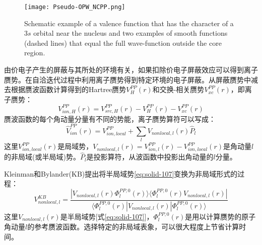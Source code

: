 \begin{figure}[h!]
\centering
\vspace*{-0.10in}
\texttt{[image: Pseudo-OPW\_NCPP.png]}
\caption{\small \textrm{Schematic example of a valence function that has the character of a $3s$ orbital near the nucleus and two examples of smooth functions (dashed lines) that equal the full wave-function outside the core region.}}%
\label{Pseudo-OPW_NCPP}
\end{figure}
由价电子产生的屏蔽与其所处的环境有关，如果扣除价电子屏蔽效应可以得到离子赝势。在自洽迭代过程中利用离子赝势得到特定环境的电子屏蔽。从屏蔽赝势中减去根据赝波函数计算得到的Hartree赝势$V_H^{PP}(r)$和交换-相关赝势$V_{xc}^{PP}(r)$，即离子赝势\cite{PRB43-1993_1991}：
$$V_{ion,H}^{PP}(r)=V_{src,H}^{PP}(r)-V_H^{PP}(r)-V_{xc}^{PP}(r)$$
赝波函数的每个角动量分量有不同的势能，离子赝势算符可以写成：
\begin{equation}
  \hat V_{ion}^{PP}(r)=V_{ion,local}^{PP}+\sum_lV_{nonlocal,l}(r)\hat P_l
  \label{eq:solid-107}
\end{equation}
这里$V_{ion,local}^{PP}(r)$是局域势，$V_{nonlocal,l}(r)=V_{ion,l}^{PP}(r)-V_{ion,local}^{PP}(r)$是角动量$l$的非局域(或半局域)势。$\hat P_l$是投影算符，从波函数中投影出角动量的$l$分量。

Kleinman和Bylander(KB)\cite{PRL48-1425_1982}提出将半局域势\eqref{eq:solid-107}变换为非局域形式的过程：
$$V_{nonlocal,l}^{KB}=\dfrac{|V_{nonlocal,l}(r)\Phi_l^{PP,0}(r)\rangle\langle\Phi_l^{PP,0}(r)V_{nonlocal,l}(r)|}{\langle\Phi_l^{PP,0}(r)|V_{nonlocal,l}(r)|\Phi_l^{PP,0}(r)\rangle}$$
这里$V_{nonlocal,l}(r)$是半局域势[式\eqref{eq:solid-107}]，$\Phi_l^{PP,0}(r)$是用以计算赝势的原子角动量$l$的参考赝波函数。选择特定的非局域表象，可以很大程度上节省计算时间。

